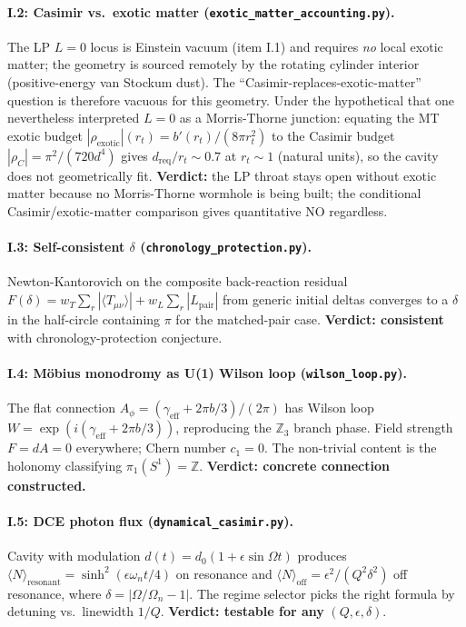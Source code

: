 \documentclass[11pt,a4paper]{article}
\begin{document}
\paragraph{I.2: Casimir vs.\ exotic matter
(\texttt{exotic\_matter\_accounting.py}).} The LP $L = 0$ locus is
Einstein vacuum (item I.1) and requires \emph{no} local
exotic matter; the geometry is sourced remotely by the rotating
cylinder interior (positive-energy van Stockum dust). The
``Casimir-replaces-exotic-matter'' question is therefore vacuous
for this geometry. Under the hypothetical that one nevertheless
interpreted $L = 0$ as a Morris-Thorne junction: equating the MT
exotic budget $|\rho_{\text{exotic}}|(r_t) = b'(r_t)/(8\pi r_t^2)$
to the Casimir budget $|\rho_C| = \pi^2/(720 d^4)$ gives
$d_{\text{req}}/r_t \sim 0.7$ at $r_t \sim 1$ (natural units), so
the cavity does not geometrically fit.
\textbf{Verdict:} the LP throat stays open without exotic matter
because no Morris-Thorne wormhole is being built; the conditional
Casimir/exotic-matter comparison gives quantitative NO regardless.

\paragraph{I.3: Self-consistent $\delta$
(\texttt{chronology\_protection.py}).} Newton-Kantorovich on the
composite back-reaction residual
$F(\delta) = w_T \sum_r |\langle T_{\mu\nu} \rangle|
+ w_L \sum_r |L_{\text{pair}}|$
from generic initial deltas converges to a $\delta$ in the
half-circle containing $\pi$ for the matched-pair case.
\textbf{Verdict: consistent} with chronology-protection conjecture.

\paragraph{I.4: M\"obius monodromy as U(1) Wilson loop
(\texttt{wilson\_loop.py}).} The flat connection
$A_\phi = (\gamma_{\text{eff}} + 2\pi b/3) / (2\pi)$ has Wilson loop
$W = \exp(i (\gamma_{\text{eff}} + 2\pi b / 3))$, reproducing the
$\mathbb{Z}_3$ branch phase. Field strength $F = dA = 0$ everywhere;
Chern number $c_1 = 0$. The non-trivial content is the holonomy
classifying $\pi_1(S^1) = \mathbb{Z}$.
\textbf{Verdict: concrete connection constructed.}

\paragraph{I.5: DCE photon flux (\texttt{dynamical\_casimir.py}).}
Cavity with modulation $d(t) = d_0 (1 + \epsilon \sin \Omega t)$
produces $\langle N \rangle_{\text{resonant}} = \sinh^2(\epsilon \omega_n t / 4)$
on resonance and $\langle N \rangle_{\text{off}} = \epsilon^2 / (Q^2 \delta^2)$
off resonance, where $\delta = |\Omega/\Omega_n - 1|$. The regime
selector picks the right formula by detuning vs.\ linewidth $1/Q$.
\textbf{Verdict: testable for any} $(Q, \epsilon, \delta)$.
\end{document}
